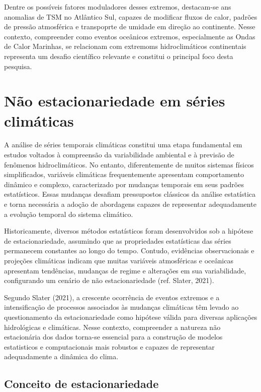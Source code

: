	Dentre os possíveis fatores moduladores desses extremos, destacam-se ans anomalias de TSM no Atlântico Sul, capazes de modificar fluxos de calor, padrões de pressão atmosférica e transpoprte de umidade em direção ao continente.
	Nesse contexto, compreender como eventos oceânicos extremos, especialmente as Ondas de Calor Marinhas, se relacionam com extremoms hidroclimáticos continentais representa um desafio científico relevante e constitui o principal foco desta pesquisa.

\section{Não estacionariedade em séries climáticas}\label{sec:nao-estacionariedade}

	A análise de séries temporais climáticas constitui uma etapa fundamental em estudos voltados à compreensão da variabilidade ambiental e à previsão de fenômenos hidroclimáticos.
	No entanto, diferentemente de muitos sistemas físicos simplificados, variáveis climáticas frequentemente apresentam comportamento dinâmico e complexo, caracterizado por mudanças temporais em seus padrões estatísticos.
	Essas mudanças desafiam pressupostos clássicos da análise estatística e torna necessária a adoção de abordagens capazes de representar adequadamente a evolução temporal do sistema climático.

	Historicamente, diversos métodos estatísticos foram desenvolvidos sob a hipótese de estacionariedade, assumindo que as propriedades estatísticas das séries permanecem constantes ao longo do tempo.
	Contudo, evidências observacionais e projeções climáticas indicam que muitas variáveis atmosféricas e oceânicas apresentam tendências, mudanças de regime e alterações em sua variabilidade, configurando um cenário de não estacionariedade (ref. Slater, 2021).

	Segundo Slater (2021), a crescente ocorrência de eventos extremos e a intensificação de processos associados às mudanças climáticas têm levado ao questionamento da estacionariedade como hipótese válida para diversas aplicações hidrológicas e climáticas.
	Nesse contexto, compreender a natureza não estacionária dos dados torna-se essencial para a construção de modelos estatisticos e computacionais mais robustos e capazes de representar adequadamente a dinâmica do clima.

\subsection{Conceito de estacionariedade}\label{sec:conceito-estacionariedade}

